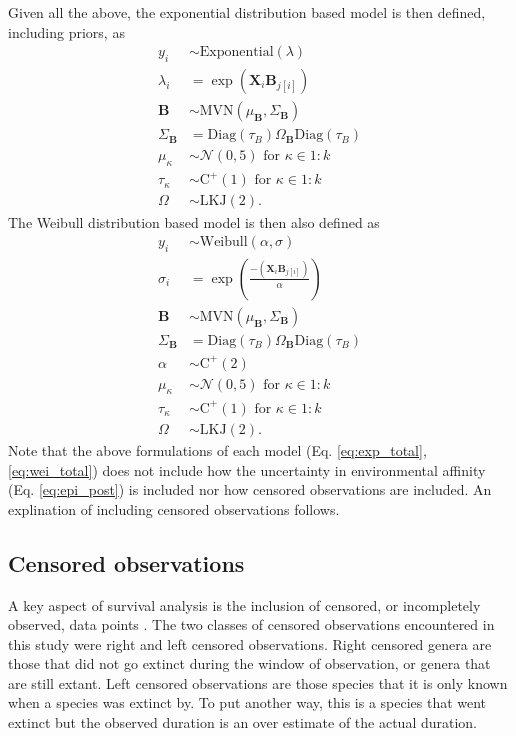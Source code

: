 \documentclass[12pt,letterpaper]{article}
\begin{document}
Given all the above, the exponential distribution based model is then defined, including priors, as 
\begin{equation}
  \begin{aligned}
    y_{i} &\sim \mathrm{Exponential}(\lambda) \\
    \lambda_{i} &= \exp(\mathbf{X}_{i} \mathbf{B}_{j[i]}) \\
    \mathbf{B} &\sim \mathrm{MVN}(\mu_{\mathbf{B}}, \Sigma_{\mathbf{B}}) \\
    \Sigma_{\mathbf{B}} &= \text{Diag}(\tau_{B}) \Omega_{\mathbf{B}} \text{Diag}(\tau_{B}) \\
    \mu_{\kappa} &\sim \mathcal{N}(0, 5) \text{ for } \kappa \in 1:k \\
    \tau_{\kappa} &\sim \mathrm{C^{+}}(1) \text{ for } \kappa \in 1:k \\
    \Omega &\sim \text{LKJ}(2).
  \end{aligned}
  \label{eq:exp_total}
\end{equation}
The Weibull distribution based model is then also defined as
\begin{equation}
  \begin{aligned}
    y_{i} &\sim \mathrm{Weibull}(\alpha, \sigma) \\
    \sigma_{i} &= \exp\left(\frac{-(\mathbf{X}_{i} \mathbf{B}_{j[i]})}{\alpha}\right) \\
    \mathbf{B} &\sim \mathrm{MVN}(\mu_{\mathbf{B}}, \Sigma_{\mathbf{B}}) \\
    \Sigma_{\mathbf{B}} &= \text{Diag}(\tau_{B}) \Omega_{\mathbf{B}} \text{Diag}(\tau_{B}) \\
    \alpha &\sim \mathrm{C^{+}}(2) \\
    \mu_{\kappa} &\sim \mathcal{N}(0, 5) \text{ for } \kappa \in 1:k \\
    \tau_{\kappa} &\sim \mathrm{C^{+}}(1) \text{ for } \kappa \in 1:k \\
    \Omega &\sim \text{LKJ}(2).
  \end{aligned}
  \label{eq:wei_total}
\end{equation}
Note that the above formulations of each model (Eq. \ref{eq:exp_total}, \ref{eq:wei_total}) does not include how the uncertainty in environmental affinity (Eq. \ref{eq:epi_post}) is included nor how censored observations are included. An explination of including censored observations follows.


\subsection{Censored observations}
A key aspect of survival analysis is the inclusion of censored, or incompletely observed, data points \citep{Ibrahim2001,Klein2003}. The two classes of censored observations encountered in this study were right and left censored observations. Right censored genera are those that did not go extinct during the window of observation, or genera that are still extant. Left censored observations are those species that it is only known when a species was extinct by. To put another way, this is a species that went extinct but the observed duration is an over estimate of the actual duration. 
\end{document}

